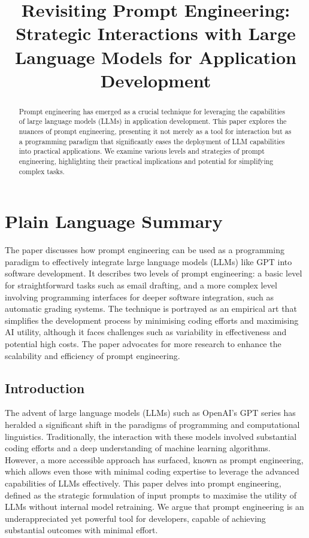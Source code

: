 \documentclass[
]{agujournal2019}
\begin{document}
\title{Revisiting Prompt Engineering: Strategic Interactions with Large
Language Models for Application Development}



\begin{abstract}
Prompt engineering has emerged as a crucial technique for leveraging the
capabilities of large language models (LLMs) in application development.
This paper explores the nuances of prompt engineering, presenting it not
merely as a tool for interaction but as a programming paradigm that
significantly eases the deployment of LLM capabilities into practical
applications. We examine various levels and strategies of prompt
engineering, highlighting their practical implications and potential for
simplifying complex tasks.
\end{abstract}

\section*{Plain Language Summary}
The paper discusses how prompt engineering can be used as a programming
paradigm to effectively integrate large language models (LLMs) like GPT
into software development. It describes two levels of prompt
engineering: a basic level for straightforward tasks such as email
drafting, and a more complex level involving programming interfaces for
deeper software integration, such as automatic grading systems. The
technique is portrayed as an empirical art that simplifies the
development process by minimising coding efforts and maximising AI
utility, although it faces challenges such as variability in
effectiveness and potential high costs. The paper advocates for more
research to enhance the scalability and efficiency of prompt
engineering.



\subsection{Introduction}\label{introduction}

The advent of large language models (LLMs) such as OpenAI's GPT series
has heralded a significant shift in the paradigms of programming and
computational linguistics. Traditionally, the interaction with these
models involved substantial coding efforts and a deep understanding of
machine learning algorithms. However, a more accessible approach has
surfaced, known as prompt engineering, which allows even those with
minimal coding expertise to leverage the advanced capabilities of LLMs
effectively. This paper delves into prompt engineering, defined as the
strategic formulation of input prompts to maximise the utility of LLMs
without internal model retraining. We argue that prompt engineering is
an underappreciated yet powerful tool for developers, capable of
achieving substantial outcomes with minimal effort.
\end{document}

